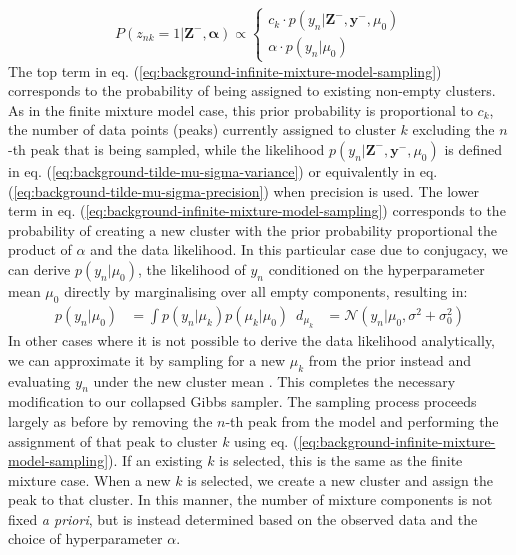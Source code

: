 \begin{equation}
P(z_{nk}=1 \vert \boldsymbol{Z}^{-}, \boldsymbol{\alpha}) \propto 
\begin{cases}
    c_k \cdot p(y_n \vert \boldsymbol{Z}^{-},  \boldsymbol{y}^{-}, \mu_0) \\
    \alpha \cdot p(y_n \vert \mu_0)
\end{cases}
\label{eq:background-infinite-mixture-model-sampling}
\end{equation}
The top term in eq. (\ref{eq:background-infinite-mixture-model-sampling}) corresponds to the probability of being assigned to existing non-empty clusters. As in the finite mixture model case, this prior probability is proportional to $c_k$, the number of data points (peaks) currently assigned to cluster $k$ excluding the $n$-th peak that is being sampled, while the likelihood $p(y_n \vert \boldsymbol{Z}^{-},  \boldsymbol{y}^{-}, \mu_0)$ is defined in eq. (\ref{eq:background-tilde-mu-sigma-variance}) or equivalently in eq. (\ref{eq:background-tilde-mu-sigma-precision}) when precision is used. The lower term in eq. (\ref{eq:background-infinite-mixture-model-sampling}) corresponds to the probability of creating a new cluster with the prior probability proportional the product of $\alpha$ and the data likelihood. In this particular case due to conjugacy, we can derive $p(y_n \vert \mu_0)$, the likelihood of $y_n$ conditioned on the hyperparameter mean $\mu_0$ directly by marginalising over all empty components, resulting in:
\begin{equation}
\begin{aligned}
p(y_n \vert \mu_0) &= \int p(y_n \vert \mu_k) p(\mu_k \vert \mu_0) \enspace d_{\mu_k}
                               &= \mathcal{N}(y_n \vert \mu_0, \sigma^2 + \sigma_0^2)
\end{aligned}
\label{eq:background-new-table-likelihood}
\end{equation}
In other cases where it is not possible to derive the data likelihood analytically, we can approximate it by sampling for a new $\mu_k$ from the prior instead and evaluating $y_n$ under the new cluster mean \cite{Rasmussen2000}. This completes the necessary modification to our collapsed Gibbs sampler. The sampling process proceeds largely as before by removing the $n$-th peak from the model and performing the assignment of that peak to cluster $k$ using eq. (\ref{eq:background-infinite-mixture-model-sampling}). If an existing $k$ is selected, this is the same as the finite mixture case. When a new $k$ is selected, we create a new cluster and assign the peak to that cluster. In this manner, the number of mixture components is not fixed \textit{a priori}, but is instead determined based on the observed data and the choice of hyperparameter $\alpha$.


